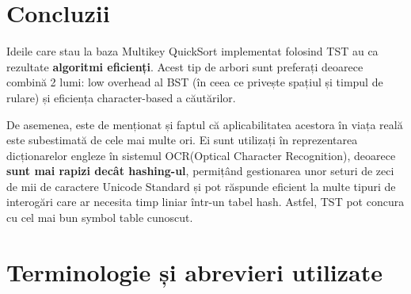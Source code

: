 \documentclass[12pt,a4paper]{article}
\begin{document}
\begin{singlespace}
\section{Concluzii}
Ideile care stau la baza Multikey QuickSort implementat folosind TST au ca rezultate \textbf{algoritmi eficienți}. Acest tip de arbori sunt preferați deoarece combină 2 lumi: low overhead al BST (în ceea ce privește spațiul și timpul de rulare) și eficiența character-based a căutărilor.
\par
De asemenea, este de menționat și faptul că aplicabilitatea acestora în viața reală este subestimată de cele mai multe ori. Ei sunt utilizați în reprezentarea dicționarelor engleze în sistemul OCR(Optical Character Recognition), deoarece \textbf{sunt mai rapizi decât hashing-ul}, permițând gestionarea unor seturi de zeci de mii de caractere Unicode Standard și pot răspunde eficient la multe tipuri de interogări care ar necesita timp liniar într-un tabel hash. Astfel, TST pot concura cu cel mai bun symbol table cunoscut.

\section{Terminologie și abrevieri utilizate}
\begin{itemize}


\end{itemize}
\end{singlespace}
\end{document}
